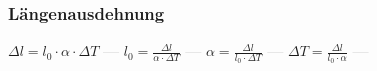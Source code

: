 \subsubsection{Längenausdehnung} 
\begin{minipage}{0.45\textwidth} 
\end{minipage} 
\begin{minipage}{0.45\textwidth} 
 
\end{minipage} 
$ \Delta l = l_{0} \cdot \alpha \cdot \Delta T $ \textcolor{lightgray}{\textbf{---}} 
$ l_{0}  = \frac{ \Delta l}{\alpha \cdot \Delta T} $ \textcolor{lightgray}{\textbf{---}} 
$ \alpha  = \frac{ \Delta l}{l_{0} \cdot \Delta T} $ \textcolor{lightgray}{\textbf{---}} 
$ \Delta T = \frac{ \Delta l}{l_{0} \cdot \alpha } $ \textcolor{lightgray}{\textbf{---}} 


